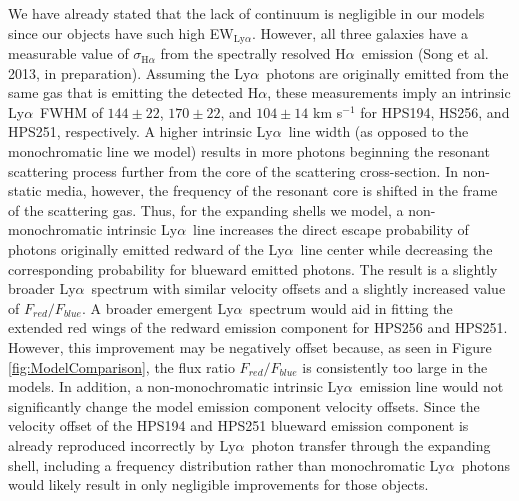 \documentclass{emulateapj}
\newcommand{\lya}{Ly$\alpha$}
\newcommand{\ha}{H$\alpha$}
\def\ewlya{EW$_{\mathrm{Ly}\alpha}$}
\begin{document}
We have already stated that the lack of continuum is negligible in our models since our objects have such high \ewlya. However, all three galaxies have a measurable value of $\sigma_{\mathrm{H}\alpha}$ from the spectrally resolved \ha\ emission (Song et al. 2013, in preparation). Assuming the \lya\ photons are originally emitted from the same gas that is emitting the detected \ha, these measurements imply an intrinsic \lya\ FWHM of $144\pm22$, $170\pm22$, and $104\pm14$ km s$^{-1}$ for HPS194, HS256, and HPS251, respectively. A higher intrinsic \lya\ line width (as opposed to the monochromatic line we model) results in more photons beginning the resonant scattering process further from the core of the scattering cross-section. In non-static media, however, the frequency of the resonant core is shifted in the frame of the scattering gas. Thus, for the expanding shells we model, a non-monochromatic intrinsic \lya\ line increases the direct escape probability of photons originally emitted redward of the \lya\ line center while decreasing the corresponding probability for blueward emitted photons. The result is a slightly broader \lya\ spectrum with similar velocity offsets and a slightly increased value of $F_{red} / F_{blue}$. A broader emergent \lya\ spectrum would aid in fitting the extended red wings of the redward emission component for HPS256 and HPS251. However, this improvement may be negatively offset because, as seen in Figure \ref{fig:ModelComparison}, the flux ratio $F_{red} / F_{blue}$ is consistently too large in the models. In addition, a non-monochromatic intrinsic \lya\ emission line would not significantly change the model emission component velocity offsets. Since the velocity offset of the HPS194 and HPS251 blueward emission component is already reproduced incorrectly by \lya\ photon transfer through the expanding shell, including a frequency distribution rather than monochromatic \lya\ photons would likely result in only negligible improvements for those objects.
\end{document}
